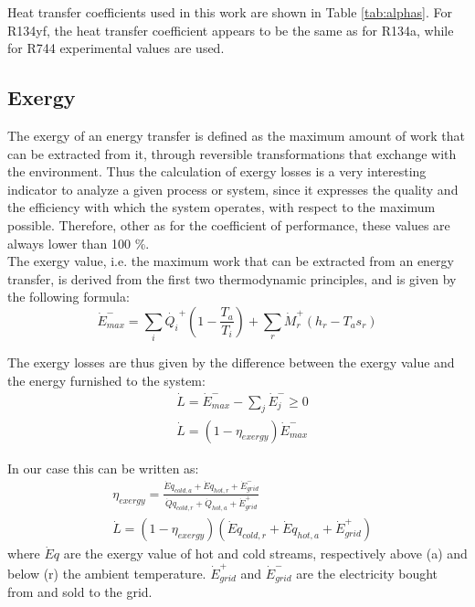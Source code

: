 \documentclass{article}
\begin{document}
Heat transfer coefficients used in this work are shown in Table \ref{tab:alphas}. For R134yf, the heat transfer coefficient appears to be the same as for R134a\cite{wangOverviewHeatTransfer2013}, while for R744 experimental values are used\cite{ohFlowBoilingHeat2011, mastrulloComparisonR744R134a2009}. \\




\subsection{Exergy}\label{ss:exergy}
The exergy of an energy transfer is defined as the maximum amount of work that can be extracted from it, through reversible transformations that exchange with the environment. Thus the calculation of exergy losses is a very interesting indicator to analyze a given process or system, since it expresses the quality and the efficiency with which the system operates, with respect to the maximum possible. Therefore, other as for the coefficient of performance, these values are always lower than 100 \%. \\

The exergy value, i.e. the maximum work that can be extracted from an energy transfer, is derived from the first two thermodynamic principles, and is given by the following formula:
\begin{equation}
    \dot{E}^{-}_{max} = \sum_{i} \dot{Q_i}^{+} (1 - \frac{T_{a}}{T_i} ) + \sum_{r} \dot{M}_{r}^{+} (h_{r} - T_{a} s_{r})    
\end{equation}

The exergy losses are thus given by the difference between the exergy value and the energy furnished to the system:
\begin{align}
	&    \dot{L} = \dot{E}^{-}_{max} - \sum_{j}\dot{E}^{-}_{j} \geq 0 \\
	& 	\dot{L} = (1-\eta_{exergy})\dot{E}^{-}_{max}
\end{align}

In our case this can be written as:
\begin{align}
    & \eta_{exergy} =  \frac{\dot{E}q_{cold,a} + \dot{E}q_{hot,r} + \dot{E}_{grid}^{-}}{\dot{Q}q_{cold,r} + \dot{Q}_{hot,a} + \dot{E}_{grid}^{+}}  \\
    & \dot{L} = (1-\eta_{exergy})(\dot{E}q_{cold,r} + \dot{E}q_{hot,a} + \dot{E}_{grid}^{+})
\end{align}
where $\dot{E}q$ are the exergy value of hot and cold streams, respectively above (a) and below (r) the ambient temperature. $\dot{E}_{grid}^{+}$ and $\dot{E}_{grid}^{-}$ are the electricity bought from and sold to the grid.
\end{document}
